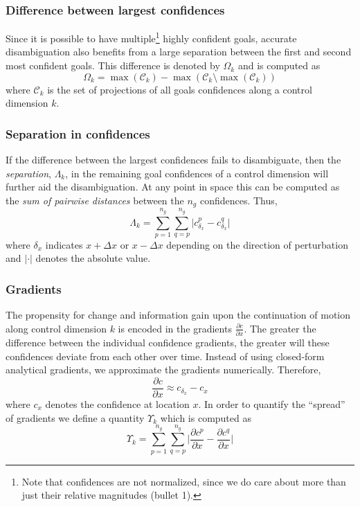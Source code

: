 \documentclass[conference]{IEEEtran}
\begin{document}
\subsubsection{Difference between largest confidences}
Since it is possible to have multiple\footnote{Note that confidences are not normalized, since we do care about more than just their relative magnitudes (bullet 1).} highly confident goals, accurate disambiguation also benefits from a large separation between the first and second most confident goals. 
This difference is denoted by $\Omega_k$ and is computed as
\begin{equation*}
\Omega_k = \max(\mathcal{C}_k) - \max(\mathcal{C}_k \setminus {\max(\mathcal{C}_k)})
\end{equation*}
where $\mathcal{C}_k$ is the set of projections of all goals confidences along a control dimension $k$.
\subsubsection{Separation in confidences}
If the difference between the largest confidences fails to disambiguate, then the \textit{separation}, $\Lambda_k$, in the remaining goal confidences of a control dimension will further aid the disambiguation. At any point in space this can be computed as the \textit{sum of pairwise distances} between the $n_g$ confidences.  Thus,
\begin{equation*}
\Lambda_k = \sum_{p=1}^{n_g}\sum_{q=p}^{n_g}\lvert c^{p}_{\delta_x} - c^{q}_{\delta_x}\rvert
\end{equation*}
where $\delta_x$ indicates $x+\Delta x$ or $x-\Delta x$ depending on the direction of perturbation and $\lvert\cdot\rvert$ denotes the absolute value.
\subsubsection{Gradients}\label{COMP4}
The propensity for change and information gain upon the continuation of motion along control dimension $k$ is encoded in the gradients $\frac{\partial c}{\partial x}$. The greater the difference between the individual confidence gradients, the greater will these confidences deviate from each other over time.  Instead of using closed-form analytical gradients, we approximate the gradients numerically. Therefore, 
\begin{equation*}
\frac{\partial c}{\partial x} \approx c_{\delta_x} - c_{x} 
\end{equation*}
where $c_x$ denotes the confidence at location $x$.
In order to quantify the ``spread'' of gradients we define a quantity $\Upsilon_k$ which is computed as 
\begin{equation*}
\Upsilon_k = \sum_{p=1}^{n_g}\sum_{q=p}^{n_g}\Big \lvert\frac{\partial c^p}{\partial x} - \frac{\partial c^q}{\partial x}\Big \rvert
\end{equation*}
\end{document}
